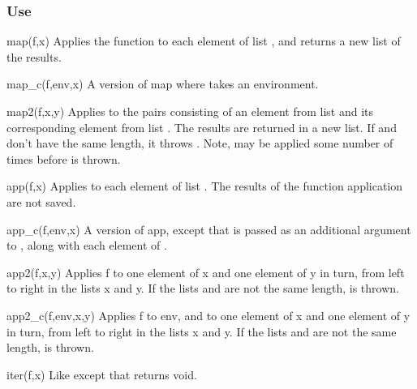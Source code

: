 \subsubsection*{Use}

\begin{defun}{map}{(f,x)}
Applies the function  to each element of list , and
returns a new list of the results.
\end{defun}

\begin{defun}{map_c}{(f,env,x)}
A version of map where  takes an environment.
\end{defun}

\begin{defun}{map2}{(f,x,y)}
Applies  to the pairs consisting of an element from list 
and its corresponding element from list .  The results are
returned in a new list.  If  and  don't have the same
length, it throws .  Note,  may be applied
some number of times before  is thrown.
\end{defun}

\begin{defun}{app}{(f,x)}
Applies  to each element of list .  The results of the
function application are not saved.
\end{defun}

\begin{defun}{app_c}{(f,env,x)}
A version of app, except that  is passed as an additional
argument to , along with each element of .
\end{defun}

\begin{defun}{app2}{(f,x,y)}
Applies f to one element of x and one element of y in turn, from left to
right in the lists x and y.  If the lists  and  are not
the same length,  is thrown.
\end{defun}

\begin{defun}{app2_c}{(f,env,x,y)}
Applies f to env, and to one element of x and one element of y in turn,
from left to right in the lists x and y.  If the lists  and
 are not the same length,  is thrown.
\end{defun}

\begin{defun}{iter}{(f,x)}
Like  except that  returns void.
\end{defun}

